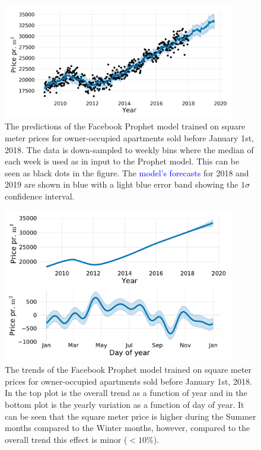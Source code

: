 \begin{figure}
  \includegraphics[draft=false, width=0.9\textwidth, trim=15 15 15 15, clip]{figures/housing/Ejerlejlighed_v18_cut_all_Ncols_all_prophet_forecast.png}
  \caption[Prophet Forecast for apartments]
          {The predictions of the Facebook Prophet model trained on square meter prices for owner-occupied apartments sold before January 1st, 2018. The data is down-sampled to weekly bins where the median of each week is used as in input to the Prophet model. This can be seen as black dots in the figure. The \textcolor{blue}{model's forecasts} for 2018 and 2019 are shown in blue with a light blue \textcolor{light-blue}{error band} showing the $1\sigma$ confidence interval.
          }
  \label{fig:h:prophet_forecast}
\end{figure}

\begin{figure}
  \includegraphics[draft=false, width=0.9\textwidth, trim=15 15 15 15, clip]{figures/housing/Ejerlejlighed_v18_cut_all_Ncols_all_prophet_trends.pdf}
  \caption[Prophet Trends]
          {The trends of the Facebook Prophet model trained on square meter prices for owner-occupied apartments sold before January 1st, 2018. In the top plot is the overall trend as a function of year and in the bottom plot is the yearly variation as a function of day of year. It can be seen that the square meter price is higher during the Summer months compared to the Winter months, however, compared to the overall trend this effect is minor ($<10\%$). 
          }
  \label{fig:h:prophet_trends}
\end{figure}


